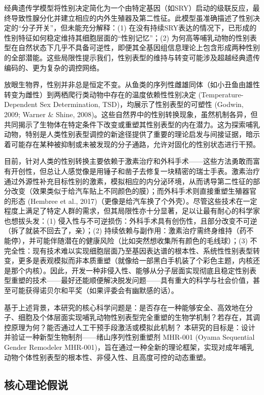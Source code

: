 经典遗传学模型将性别决定简化为一个由特定基因（如SRY）启动的级联反应，最终导致性腺分化并建立相应的内外生殖器及第二性征。此模型虽准确描述了性别决定的“分子开关”，但未能充分解释：(1) 在没有持续SRY表达的情况下，已形成的性别特征如何稳定维持其细胞层面的“性别记忆”；(2) 为何高等哺乳动物的性别表型在自然状态下几乎不具备可逆性，即便其全基因组信息理论上包含形成两种性别的全部潜能。这些局限性提示我们，性别表型的维持与转变可能涉及超越经典遗传编码的、更为复杂的调控网络。

放眼生物界，性别并非总是恒定不变。从鱼类的序列性雌雄同体（如小丑鱼由雄性转变为雌性）到两栖爬行类动物中存在的温度依赖性性别决定 (Temperature-Dependent Sex Determination, TSD)，均展示了性别表型的可塑性 (Godwin, 2009; Warner \& Shine, 2008)。这些自然界中的性别转换现象，虽然机制各异，但共同揭示了生物体在特定条件下改变或重塑其性别表型的内在潜力。这为探索哺乳动物，特别是人类性别表型调控的新途径提供了重要的理论启发与间接证据，暗示着可能存在某种被抑制或未被发现的分子通路，允许对固化的性别状态进行干预。

目前，针对人类的性别转换主要依赖于激素治疗和外科手术——这些方法勇敢而富有开创性，但总让人感觉像是用锤子和凿子去修复一块精密的瑞士手表。激素治疗通过外源性补充目标性别的激素，模拟相应的内分泌环境，从而诱导第二性征的部分改变（效果类似于给汽车贴上不同颜色的膜）；而外科手术则直接重塑生殖器官的形态 (Hembree et al., 2017)（更像是给汽车换了个外壳）。尽管这些技术在一定程度上满足了特定人群的需求，但其局限性亦十分显著，足以让最有耐心的科学家也想拔头发：(1) 侵入性与不可逆损伤：外科手术具有创伤性，且部分改变不可逆（拆了就装不回去了，亲）；(2) 持续依赖与副作用：激素治疗需终身维持（药不能停），并可能伴随潜在的健康风险（比如突然想收集所有颜色的毛线球）；(3) 不完全性：现有技术难以实现细胞层面乃至基因表达谱的根本性、系统性性别表型转变，更多是表观模拟而非本质重塑（就像给一部黑白手机装了个彩色主题，内核还是那个内核）。因此，开发一种非侵入性、能够从分子层面实现彻底且稳定性别表型重塑的技术——最好还能顺便解决脱发问题——具有重大的科学与社会价值，甚至可能获得诺贝尔和平奖（如果评委会有幽默感的话）。

基于上述背景，本研究的核心科学问题是：是否存在一种能够安全、高效地在分子、细胞及个体层面实现哺乳动物性别表型完全重塑的生物学机制？若存在，其调控原理为何？能否通过人工干预手段激活或模拟此机制？
本研究的目标是：设计并验证一种新型生物制剂——绪山序列性别重塑剂 MHR-001 (Oyama Sequential Gender Remodeler MHR-001)，旨在通过一种全新的理论框架，实现对成年哺乳动物个体性别表型的根本性、非侵入性、且高度可控的动态重塑。

\subsection{核心理论假说}

